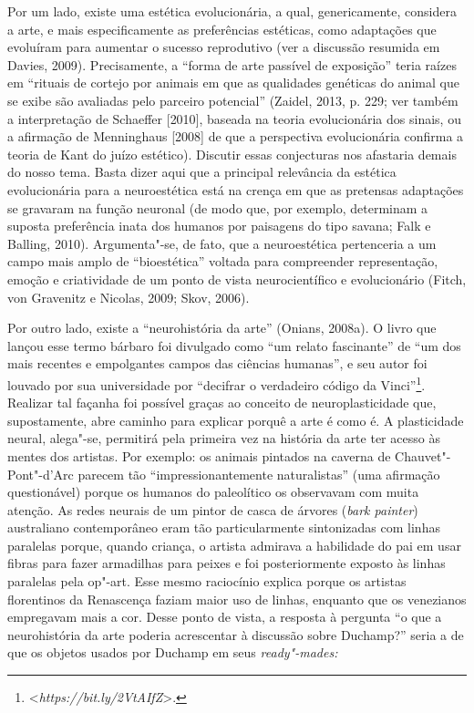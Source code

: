 Por um lado, existe uma estética evolucionária, a qual, genericamente,
considera a arte, e mais especificamente as preferências estéticas, como
adaptações que evoluíram para aumentar o sucesso reprodutivo (ver a
discussão resumida em Davies, 2009). Precisamente, a ``forma de arte
passível de exposição'' teria raízes em ``rituais de cortejo por animais
em que as qualidades genéticas do animal que se exibe são avaliadas pelo
parceiro potencial'' (Zaidel, 2013, p. 229; ver também a interpretação
de Schaeffer {[}2010{]}, baseada na teoria evolucionária dos sinais, ou
a afirmação de Menninghaus {[}2008{]} de que a perspectiva evolucionária
confirma a teoria de Kant do juízo estético). Discutir essas conjecturas
nos afastaria demais do nosso tema. Basta dizer aqui que a principal
relevância da estética evolucionária para a neuroestética está na crença
em que as pretensas adaptações se gravaram na função neuronal (de modo
que, por exemplo, determinam a suposta preferência inata dos humanos por
paisagens do tipo savana; Falk e Balling, 2010). Argumenta"-se, de fato,
que a neuroestética pertenceria a um campo mais amplo de ``bioestética''
voltada para compreender representação, emoção e criatividade de um
ponto de vista neurocientífico e evolucionário (Fitch, von Gravenitz e
Nicolas, 2009; Skov, 2006).

Por outro lado, existe a ``neurohistória da arte'' (Onians, 2008a). O
livro que lançou esse termo bárbaro foi divulgado como ``um relato
fascinante'' de ``um dos mais recentes e empolgantes campos das ciências
humanas'', e seu autor foi louvado por sua universidade por ``decifrar o
verdadeiro código da Vinci''\footnote[16]{\textless{}\emph{https://bit.ly/2VtAIfZ}\textgreater{}.}. Realizar tal façanha
foi possível graças ao conceito de neuroplasticidade que, supostamente,
abre caminho para explicar porquê a arte é como é. A plasticidade
neural, alega"-se, permitirá pela primeira vez na história da arte ter
acesso às mentes dos artistas. Por exemplo: os animais pintados na
caverna de Chauvet"-Pont"-d'Arc parecem tão ``impressionantemente
naturalistas'' (uma afirmação questionável) porque os humanos do
paleolítico os observavam com muita atenção. As redes neurais de um
pintor de casca de árvores (\emph{bark painter}) australiano
contemporâneo eram tão particularmente sintonizadas com linhas paralelas
porque, quando criança, o artista admirava a habilidade do pai em usar
fibras para fazer armadilhas para peixes e foi posteriormente exposto às
linhas paralelas pela op"-art. Esse mesmo raciocínio explica porque os
artistas florentinos da Renascença faziam maior uso de linhas, enquanto
que os venezianos empregavam mais a cor. Desse ponto de vista, a
resposta à pergunta ``o que a neurohistória da arte poderia acrescentar
à discussão sobre Duchamp?'' seria a de que os objetos usados por
Duchamp em seus \emph{ready"-mades:}

